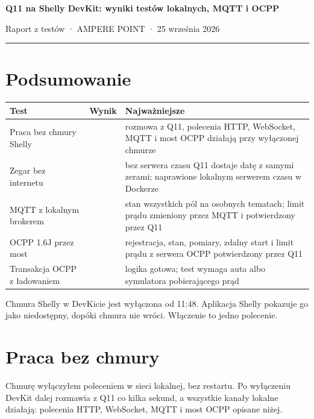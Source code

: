 \documentclass[11pt,a4paper]{article}
\begin{document}
{\LARGE\bfseries Q11 na Shelly DevKit: wyniki testów lokalnych, MQTT i OCPP\par}
{\large Raport z testów · AMPERE POINT · 25 września 2026\par}
\vspace{4pt}\textcolor{apteal}{\rule{\textwidth}{1.2pt}}

\section{Podsumowanie}

\begin{longtable}{>{\raggedright\arraybackslash}p{3.49cm}>{\raggedright\arraybackslash}p{1.12cm}>{\raggedright\arraybackslash}p{10.66cm}}
\toprule
\rowcolor{apteallight}\textbf{Test} & \textbf{Wynik} & \textbf{Najważniejsze} \\
\midrule\endhead
\bottomrule\endfoot
Praca bez chmury Shelly & \leavevmode{\symbolfont\color{apgreen}\textbf{✔}} & rozmowa z Q11, polecenia HTTP, WebSocket, MQTT i most OCPP działają przy wyłączonej chmurze \\
Zegar bez internetu & \leavevmode{\symbolfont\color{apgreen}\textbf{✔}} & bez serwera czasu Q11 dostaje datę z samymi zerami; naprawione lokalnym serwerem czasu w Dockerze \\
MQTT z lokalnym brokerem & \leavevmode{\symbolfont\color{apgreen}\textbf{✔}} & stan wszystkich pól na osobnych tematach; limit prądu zmieniony przez MQTT i potwierdzony przez Q11 \\
OCPP 1.6J przez most & \leavevmode{\symbolfont\color{apgreen}\textbf{✔}} & rejestracja, stan, pomiary, zdalny start i limit prądu z serwera OCPP potwierdzony przez Q11 \\
Transakcja OCPP z ładowaniem & \leavevmode{\symbolfont\color{apamber}\textbf{◐}} & logika gotowa; test wymaga auta albo symulatora pobierającego prąd \\
\end{longtable}

Chmura Shelly w DevKicie jest wyłączona od 11:48. Aplikacja Shelly pokazuje go jako niedostępny, dopóki chmura nie wróci. Włączenie to jedno polecenie.


\section{Praca bez chmury}

Chmurę wyłączyłem poleceniem w sieci lokalnej, bez restartu. Po wyłączeniu DevKit dalej rozmawia z Q11 co kilka sekund, a wszystkie kanały lokalne działają: polecenia HTTP, WebSocket, MQTT i most OCPP opisane niżej.
\end{document}
